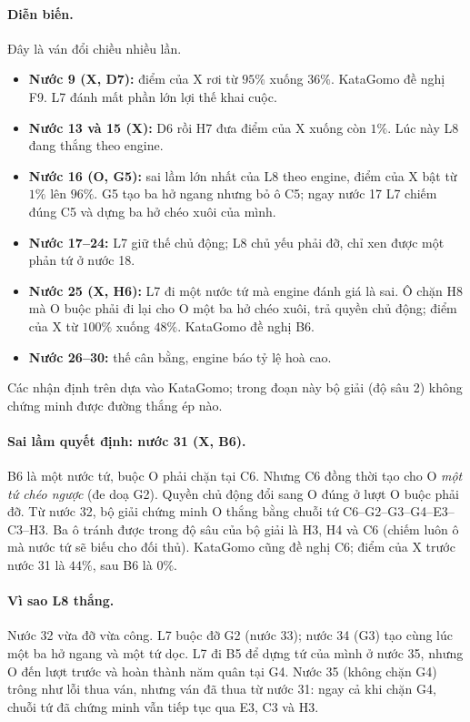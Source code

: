 \paragraph{Diễn biến.} Đây là ván đổi chiều nhiều lần.
\begin{itemize}
  \item \textbf{Nước 9 (X, D7):} điểm của X rơi từ $95\%$ xuống $36\%$. KataGomo đề nghị F9. L7 đánh mất phần lớn lợi thế
  khai cuộc.
  \item \textbf{Nước 13 và 15 (X):} D6 rồi H7 đưa điểm của X xuống còn $1\%$. Lúc này L8 đang thắng theo engine.
  \item \textbf{Nước 16 (O, G5):} sai lầm lớn nhất của L8 theo engine, điểm của X bật từ $1\%$ lên $96\%$. G5 tạo ba hở
  ngang nhưng bỏ ô C5; ngay nước 17 L7 chiếm đúng C5 và dựng ba hở chéo xuôi của mình.
  \item \textbf{Nước 17--24:} L7 giữ thế chủ động; L8 chủ yếu phải đỡ, chỉ xen được một phản tứ ở nước 18.
  \item \textbf{Nước 25 (X, H6):} L7 đi một nước tứ mà engine đánh giá là sai. Ô chặn H8 mà O buộc phải đi lại cho O một ba hở
  chéo xuôi, trả quyền chủ động; điểm của X từ $100\%$ xuống $48\%$. KataGomo đề nghị B6.
  \item \textbf{Nước 26--30:} thế cân bằng, engine báo tỷ lệ hoà cao.
\end{itemize}
Các nhận định trên dựa vào KataGomo; trong đoạn này bộ giải (độ sâu 2) không chứng minh được đường thắng ép nào.

\paragraph{Sai lầm quyết định: nước 31 (X, B6).} B6 là một nước tứ, buộc O phải chặn tại C6. Nhưng C6 đồng thời tạo cho
O \emph{một tứ chéo ngược} (đe doạ G2). Quyền chủ động đổi sang O đúng ở lượt O buộc phải đỡ. Từ nước 32, bộ giải chứng
minh O thắng bằng chuỗi tứ C6--G2--G3--G4--E3--C3--H3. Ba ô tránh được trong độ sâu của bộ giải là H3, H4 và C6 (chiếm
luôn ô mà nước tứ sẽ biếu cho đối thủ). KataGomo cũng đề nghị C6; điểm của X trước nước 31 là $44\%$, sau B6 là $0\%$.

\paragraph{Vì sao L8 thắng.} Nước 32 vừa đỡ vừa công. L7 buộc đỡ G2 (nước 33); nước 34 (G3) tạo cùng lúc một ba hở
ngang và một tứ dọc. L7 đi B5 để dựng tứ của mình ở nước 35, nhưng O đến lượt trước và hoàn thành năm quân tại G4.
Nước 35 (không chặn G4) trông như lỗi thua ván, nhưng ván đã thua từ nước 31: ngay cả khi
chặn G4, chuỗi tứ đã chứng minh vẫn tiếp tục qua E3, C3 và H3.


